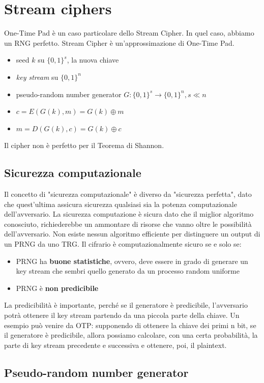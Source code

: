 \documentclass[a4paper,12pt]{article}
\begin{document}
\section{Stream ciphers}
One-Time Pad è un caso particolare dello Stream Cipher. In quel caso, abbiamo un RNG perfetto. 
Stream Cipher è un'approssimazione di One-Time Pad.
\begin{itemize}
	\item seed $k$ su $\{0,1\}^s$, la nuova chiave
	\item \textit{key stream} su $\{0,1\}^n$
	\item pseudo-random number generator $G : \{0,1\}^s \rightarrow \{0,1\}^n, s \ll n$
	\item $c = E(G(k), m) = G(k) \oplus m$
	\item $m = D(G(k), c) = G(k) \oplus c$
\end{itemize}
Il cipher non è perfetto per il Teorema di Shannon. 

\subsection{Sicurezza computazionale}
Il concetto di "sicurezza computazionale" è diverso da "sicurezza perfetta", dato che quest'ultima assicura sicurezza qualsiasi sia la potenza computazionale dell'avversario.
La sicurezza computazione è sicura dato che il miglior algoritmo conosciuto, richiederebbe un ammontare di risorse che vanno oltre le possibilità dell'avversario.
Non esiste nessun algoritmo efficiente per distinguere un output di un PRNG da uno TRG.
Il cifrario è computazionalmente sicuro se e solo se:
\begin{itemize}
	\item PRNG ha \textbf{buone statistiche}, ovvero, deve essere in grado di generare un key stream che sembri quello generato da un processo random uniforme
	\item PRNG è \textbf{non predicibile}
\end{itemize}
La predicibilità è importante, perché se il generatore è predicibile, l'avversario potrà ottenere il key stream partendo da una piccola parte della chiave.
Un esempio può venire da OTP: supponendo di ottenere la chiave dei primi n bit, se il generatore è predicibile, allora possiamo calcolare,
con una certa probabilità, la parte di key stream precedente e successiva e ottenere, poi, il plaintext.

\subsection{Pseudo-random number generator}
\end{document}
